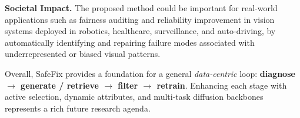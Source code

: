 \documentclass[10pt]{article} %
\newcommand{\model}{SafeFix\xspace}
\begin{document}
\textbf{Societal Impact.} The proposed method could be important for real-world applications such as fairness auditing and reliability improvement in vision systems deployed in robotics, healthcare, surveillance, and auto-driving, by automatically identifying and repairing failure modes associated with underrepresented or biased visual patterns.

Overall, \model{} provides a foundation for a general \emph{data-centric}
loop: \textbf{diagnose $\rightarrow$ generate / retrieve $\rightarrow$
filter $\rightarrow$ retrain}.  Enhancing each stage with active
selection, dynamic attributes, and multi-task diffusion backbones
represents a rich future research agenda.
\end{document}
